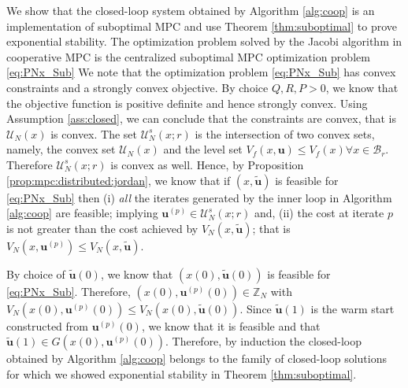 \documentclass[10pt]{article}
\newcommand{\bu}{\mathbf{u}}
\theoremstyle{definition}
\begin{document}
We show that the closed-loop system obtained by Algorithm
\ref{alg:coop} is an implementation of suboptimal MPC
and use Theorem \ref{thm:suboptimal} to prove exponential
stability. The optimization problem solved by the Jacobi algorithm in
cooperative MPC is the centralized suboptimal MPC optimization problem \eqref{eq:PNx_Sub}
We note that the optimization problem \eqref{eq:PNx_Sub} 
has convex constraints and a strongly convex objective. By choice
$Q,R,P>0$, we know that the objective function is positive definite
and hence strongly  convex. Using Assumption \ref{ass:closed}, we
can conclude that the constraints are convex, that is
$\mathcal{U}_N(x)$ is convex. 
The set
$\mathcal{U}_N^{s}(x;r)$ is the intersection of two convex
sets, namely, the convex set $\mathcal{U}_N(x)$ and the level set
$V_f(x,\bu) \leq V_f(x) \forall x \in \mathcal{B}_r$. Therefore
$\mathcal{U}_N^s(x;r)$ is convex as well. Hence, by Proposition \ref{prop:mpc:distributed:jordan}, we know
that  if $(x,\tilde{\bu})$ is feasible for
\eqref{eq:PNx_Sub} then (i) {\emph{all}} the iterates generated by the inner loop in  Algorithm
\ref{alg:coop} are feasible; implying $\bu^{(p)} \in
\mathcal{U}_N^{s}(x;r)$ and, (ii) the cost at iterate $p$ is not
greater than the cost achieved by $V_N(x,\tilde{\bu})$; that is
$V_N(x,\bu^{(p)}) \leq V_N(x,\tilde{\bu})$. 

By choice of $\tilde{\bu}(0)$, we know that $(x(0),\tilde{\bu}(0))$ is
feasible for \eqref{eq:PNx_Sub}. Therefore,
$(x(0),\bu^{(p)}(0)) \in \mathbb{Z}_N$ with $V_N(x(0),\bu^{(p)}(0))
\leq V_N(x(0), \tilde{\bu}(0))$. Since $\tilde{\bu}(1)$ is the warm
start constructed from $\bu^{(p)}(0)$, we know that it is feasible and
that $\tilde{\bu}(1) \in G(x(0),\bu^{(p)}(0))$. Therefore, by induction
the closed-loop obtained by
Algorithm \ref{alg:coop} belongs to the family of
closed-loop solutions for which we showed exponential stability in
Theorem \ref{thm:suboptimal}.
\end{document}
